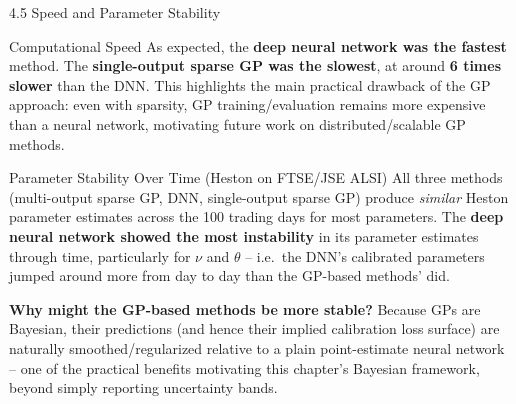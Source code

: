 \documentclass[aspectratio=169,10pt]{beamer}
\begin{document}
\begin{frame}[allowframebreaks]{4.5 Speed and Parameter Stability}

\begin{block}{Computational Speed}
As expected, the \textbf{deep neural network was the fastest} method. The
\textbf{single-output sparse GP was the slowest}, at around
\textbf{6 times slower} than the DNN. This highlights the main practical
drawback of the GP approach: even with sparsity, GP training/evaluation
remains more expensive than a neural network, motivating future work on
distributed/scalable GP methods.
\end{block}

\begin{block}{Parameter Stability Over Time (Heston on FTSE/JSE ALSI)}
All three methods (multi-output sparse GP, DNN, single-output sparse GP)
produce \emph{similar} Heston parameter estimates across the 100 trading
days for most parameters. The \textbf{deep neural network showed the
most instability} in its parameter estimates through time, particularly
for $\nu$ and $\theta$ -- i.e.\ the DNN's calibrated parameters jumped
around more from day to day than the GP-based methods' did.
\end{block}

\framebreak

\textbf{Why might the GP-based methods be more stable?} Because GPs are
Bayesian, their predictions (and hence their implied calibration loss
surface) are naturally smoothed/regularized relative to a plain
point-estimate neural network -- one of the practical benefits motivating
this chapter's Bayesian framework, beyond simply reporting uncertainty
bands.

\end{frame}
\end{document}
